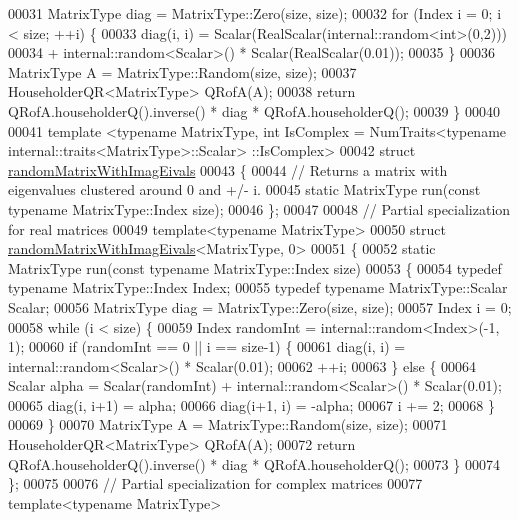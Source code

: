 \begin{DoxyCode}
00031   MatrixType diag = MatrixType::Zero(size, size);
00032   \textcolor{keywordflow}{for} (Index i = 0; i < size; ++i) \{
00033     diag(i, i) = Scalar(RealScalar(internal::random<int>(0,2)))
00034       + internal::random<Scalar>() * Scalar(RealScalar(0.01));
00035   \}
00036   MatrixType A = MatrixType::Random(size, size);
00037   HouseholderQR<MatrixType> QRofA(A);
00038   \textcolor{keywordflow}{return} QRofA.householderQ().inverse() * diag * QRofA.householderQ();
00039 \}
00040 
00041 template <typename MatrixType, int IsComplex = NumTraits<typename internal::traits<MatrixType>::Scalar>
      ::IsComplex>
00042 \textcolor{keyword}{struct }\hyperlink{structrandom_matrix_with_imag_eivals}{randomMatrixWithImagEivals}
00043 \{
00044   \textcolor{comment}{// Returns a matrix with eigenvalues clustered around 0 and +/- i.}
00045   \textcolor{keyword}{static} MatrixType run(\textcolor{keyword}{const} \textcolor{keyword}{typename} MatrixType::Index size);
00046 \};
00047 
00048 \textcolor{comment}{// Partial specialization for real matrices}
00049 \textcolor{keyword}{template}<\textcolor{keyword}{typename} MatrixType>
00050 \textcolor{keyword}{struct }\hyperlink{structrandom_matrix_with_imag_eivals}{randomMatrixWithImagEivals}<MatrixType, 0>
00051 \{
00052   \textcolor{keyword}{static} MatrixType run(\textcolor{keyword}{const} \textcolor{keyword}{typename} MatrixType::Index size)
00053   \{
00054     \textcolor{keyword}{typedef} \textcolor{keyword}{typename} MatrixType::Index Index;
00055     \textcolor{keyword}{typedef} \textcolor{keyword}{typename} MatrixType::Scalar Scalar;
00056     MatrixType diag = MatrixType::Zero(size, size);
00057     Index i = 0;
00058     \textcolor{keywordflow}{while} (i < size) \{
00059       Index randomInt = internal::random<Index>(-1, 1);
00060       \textcolor{keywordflow}{if} (randomInt == 0 || i == size-1) \{
00061         diag(i, i) = internal::random<Scalar>() * Scalar(0.01);
00062         ++i;
00063       \} \textcolor{keywordflow}{else} \{
00064         Scalar alpha = Scalar(randomInt) + internal::random<Scalar>() * Scalar(0.01);
00065         diag(i, i+1) = alpha;
00066         diag(i+1, i) = -alpha;
00067         i += 2;
00068       \}
00069     \}
00070     MatrixType A = MatrixType::Random(size, size);
00071     HouseholderQR<MatrixType> QRofA(A);
00072     \textcolor{keywordflow}{return} QRofA.householderQ().inverse() * diag * QRofA.householderQ();
00073   \}
00074 \};
00075 
00076 \textcolor{comment}{// Partial specialization for complex matrices}
00077 \textcolor{keyword}{template}<\textcolor{keyword}{typename} MatrixType>

\end{DoxyCode}
